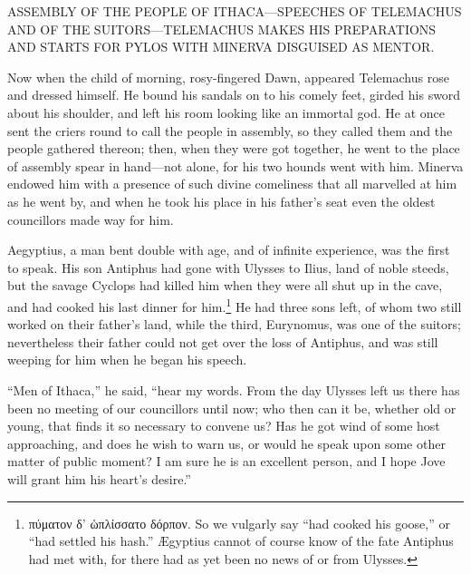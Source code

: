 
ASSEMBLY OF THE PEOPLE OF ITHACA—SPEECHES OF TELEMACHUS AND OF THE
SUITORS—TELEMACHUS MAKES HIS PREPARATIONS AND STARTS FOR PYLOS WITH MINERVA
DISGUISED AS MENTOR.

Now when the child of morning, rosy-fingered Dawn, appeared Telemachus rose and
dressed himself. He bound his sandals on to his comely feet, girded his sword
about his shoulder, and left his room looking like an immortal god. He at once
sent the criers round to call the people in assembly, so they called them and
the people gathered thereon; then, when they were got together, he went to the
place of assembly spear in hand—not alone, for his two hounds went with him.
Minerva endowed him with a presence of such divine comeliness that all
marvelled at him as he went by, and when he took his place in his father’s seat
even the oldest councillors made way for him.

Aegyptius, a man bent double with age, and of infinite experience, was the
first to speak. His son Antiphus had gone with Ulysses to Ilius, land of noble
steeds, but the savage Cyclops had killed him when they were all shut up in the
cave, and had cooked his last dinner for him.\footnote{πύματον δ’
ὡπλίσσατο
δόρπον. So we vulgarly say “had cooked his
goose,” or “had settled his hash.” Ægyptius cannot of course know of the fate
Antiphus had met with, for there had as yet been no news of or from Ulysses.} He had three sons left, of whom two
still worked on their father’s land, while the third, Eurynomus, was one of the
suitors; nevertheless their father could not get over the loss of Antiphus, and
was still weeping for him when he began his speech.

“Men of Ithaca,” he said, “hear my words. From the day Ulysses left us there
has been no meeting of our councillors until now; who then can it be, whether
old or young, that finds it so necessary to convene us? Has he got wind of some
host approaching, and does he wish to warn us, or would he speak upon some
other matter of public moment? I am sure he is an excellent person, and I hope
Jove will grant him his heart’s desire.”

